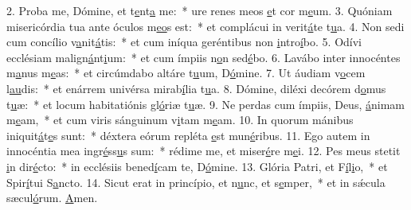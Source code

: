 2. Proba me, Dómine, et t\uline{e}nt\uline{a} me:~* ure renes meos \uline{e}t cor m\uline{e}um.
3. Quóniam misericórdia tua ante óculos m\uline{e}\uline{o}s est:~* et complácui in verit\uline{á}te t\uline{u}a.
4. Non sedi cum concílio v\uline{a}nit\uline{á}tis:~* et cum iníqua geréntibus non \uline{i}ntro\uline{í}bo.
5. Odívi ecclésiam malign\uline{á}nt\uline{i}um:~* et cum ímpiis n\uline{o}n sed\uline{é}bo.
6. Lavábo inter innocéntes m\uline{a}nus m\uline{e}as:~* et circúmdabo altáre t\uline{u}um, D\uline{ó}mine.
7. Ut áudiam v\uline{o}cem l\uline{au}dis:~* et enárrem univérsa mirab\uline{í}lia t\uline{u}a.
8. Dómine, diléxi decórem d\uline{o}mus t\uline{u}æ:~* et locum habitatiónis gl\uline{ó}riæ t\uline{u}æ.
9. Ne perdas cum ímpiis, Deus, \uline{á}nimam m\uline{e}am,~* et cum viris sánguinum v\uline{i}tam m\uline{e}am.
10. In quorum mánibus iniquit\uline{á}t\uline{e}s sunt:~* déxtera eórum repléta \uline{e}st mun\uline{é}ribus.
11. Ego autem in innocéntia mea ingr\uline{é}ss\uline{u}s sum:~* rédime me, et miser\uline{é}re m\uline{e}i.
12. Pes meus stetit \uline{i}n dir\uline{é}cto:~* in ecclésiis bened\uline{í}cam te, D\uline{ó}mine.
13. Glória Patri, et F\uline{í}l\uline{i}o,~* et Spir\uline{í}tui S\uline{a}ncto.
14. Sicut erat in princípio, et n\uline{u}nc, et s\uline{e}mper,~* et in sǽcula sæcul\uline{ó}rum. \uline{A}men.
